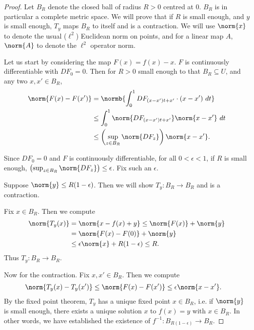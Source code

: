 \documentclass[12pt]{article}
\begin{document}
\begin{proof}
Let $B_R$ denote the closed ball of radius $R > 0$ centred at $0$. $B_R$ is in particular a complete metric space. We will prove that if $R$ is small enough, and $y$ is small enough, $T_y$ maps $B_R$ to itself and is a contraction. We will use $\norm{x}$ to denote the usual ($\ell^2$) Euclidean norm on points, and for a linear map $A$, $\norm{A}$ to denote the $\ell^2$ operator norm.

Let us start by considering the map $F(x) = f(x)-x$. $F$ is continuously differentiable with $DF_0 = 0$. Then for $R > 0$ small enough to that $B_R \subseteq U$, and any two $x,x' \in B_R$, 
\begin{align*}
\norm{F(x)-F(x')} &= \normb{\int_0^1 DF_{(x-x')t+x'}\cdot (x-x')\ dt}\\
&\leq \int_0^1 \norm{DF_{(x-x')t+x'}}\norm{x-x'}\ dt\\
&\leq \left(\sup_{z \in B_R}\norm{DF_z}\right)\norm{x-x'}.\end{align*}

Since $DF_0 = 0$ and $F$ is continuously differentiable, for all $0 < \epsilon < 1$, if $R$ is small enough, $\left(\sup_{z \in B_R}\norm{DF_z}\right) \leq \epsilon$. Fix such an $\epsilon$.

Suppose $\norm{y} \leq R(1-\epsilon)$. Then we will show $T_y: B_R \to B_R$ and is a contraction.

Fix $x \in B_R$. Then we compute
\begin{align*}
\norm{T_y(x)} &= \norm{x-f(x)+y} \leq \norm{F(x)} + \norm{y}\\
&= \norm{F(x)-F(0)} + \norm{y}\\
&\leq \epsilon\norm{x} + R(1-\epsilon) \leq R.\end{align*} Thus $T_y:B_R \to B_R$.

Now for the contraction. Fix $x,x' \in B_R$. Then we compute
\begin{align*}
\norm{T_y(x)-T_y(x')} &\leq \norm{F(x)-F(x')} \leq \epsilon\norm{x-x'}.\end{align*} By the fixed point theorem, $T_y$ has a unique fixed point $x \in B_R$, i.e. if $\norm{y}$ is small enough, there exists a unique solution $x$ to $f(x) = y$ with $x \in B_R$. In other words, we have established the existence of $f^{-1}:B_{R(1-\epsilon)} \to B_R$.


\end{proof}
\end{document}
